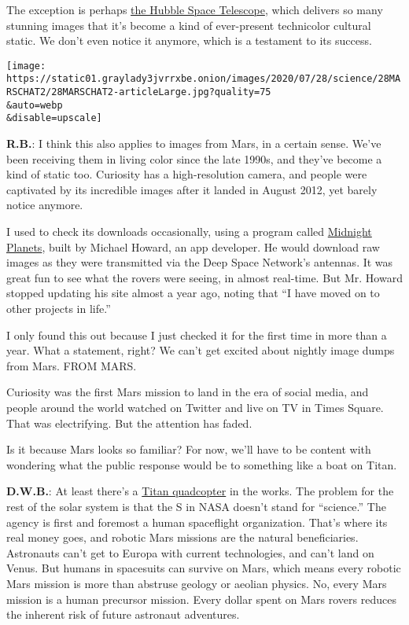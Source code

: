 The exception is perhaps
\href{https://www.nytimes3xbfgragh.onion/2020/04/24/science/hubble-telescope-30th-birthday.html}{the
Hubble Space Telescope}, which delivers so many stunning images that
it's become a kind of ever-present technicolor cultural static. We don't
even notice it anymore, which is a testament to its success.

\texttt{[image: https://static01.graylady3jvrrxbe.onion/images/2020/07/28/science/28MARSCHAT2/28MARSCHAT2-articleLarge.jpg?quality=75\\\&auto=webp\\\&disable=upscale]}

\textbf{R.B.}: I think this also applies to images from Mars, in a
certain sense. We've been receiving them in living color since the late
1990s, and they've become a kind of static too. Curiosity has a
high-resolution camera, and people were captivated by its incredible
images after it landed in August 2012, yet barely notice anymore.

I used to check its downloads occasionally, using a program called
\href{http://www.midnightplanets.com/index.html}{Midnight Planets},
built by Michael Howard, an app developer. He would download raw images
as they were transmitted via the Deep Space Network's antennas. It was
great fun to see what the rovers were seeing, in almost real-time. But
Mr. Howard stopped updating his site almost a year ago, noting that ``I
have moved on to other projects in life.''

I only found this out because I just checked it for the first time in
more than a year. What a statement, right? We can't get excited about
nightly image dumps from Mars. FROM MARS.

Curiosity was the first Mars mission to land in the era of social media,
and people around the world watched on Twitter and live on TV in Times
Square. That was electrifying. But the attention has faded.

Is it because Mars looks so familiar? For now, we'll have to be content
with wondering what the public response would be to something like a
boat on Titan.

\textbf{D.W.B.}: At least there's a
\href{https://www.nytimes3xbfgragh.onion/2019/06/27/science/nasa-titan-dragonfly-caesar.html}{Titan
quadcopter} in the works. The problem for the rest of the solar system
is that the S in NASA doesn't stand for ``science.'' The agency is first
and foremost a human spaceflight organization. That's where its real
money goes, and robotic Mars missions are the natural beneficiaries.
Astronauts can't get to Europa with current technologies, and can't land
on Venus. But humans in spacesuits can survive on Mars, which means
every robotic Mars mission is more than abstruse geology or aeolian
physics. No, every Mars mission is a human precursor mission. Every
dollar spent on Mars rovers reduces the inherent risk of future
astronaut adventures.

